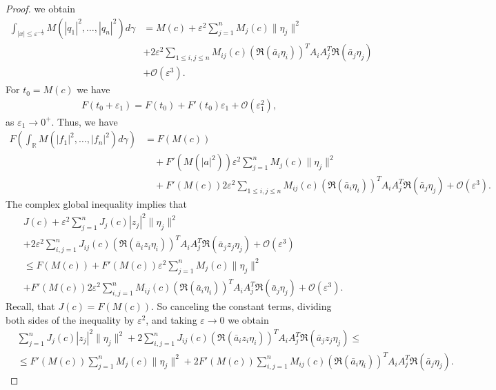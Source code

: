 \documentclass[10pt,a4paper]{amsart}
\begin{document}
\begin{proof}
		we obtain
		\begin{align*}
			\int_{| x|\leq \varepsilon^{-\frac{1}{2}}}M(|q_1|^2,\ldots,|q_n|^2)d\gamma &= M(c)  +\varepsilon^2\sum_{j=1}^n M_j(c) \|\eta_j\|^2\\
			&+ 2\varepsilon^2\sum_{1\leq i,j\leq n} M_{ij}(c)(\Re(\bar{a}_{i}\eta_{i}))^{T} A_iA_j^T\Re(\bar{a}_{j}\eta_{j})\\
   &+ \mathcal{O}(\varepsilon^3).
		\end{align*}
		For $t_{0}=M(c)$ we have 
		\begin{align*}
			F(t_{0}+\varepsilon_{1}) = F(t_{0}) +F'(t_{0})\varepsilon_{1}+\mathcal{O}(\varepsilon_{1}^{2}),
		\end{align*}
		as $\varepsilon_{1} \to 0^{+}$. Thus, we have
		\begin{align*}
			F\left( \int_{\mathbb{R}} M(|f_1|^2,\ldots,|f_n|^2) d\gamma\right) &  = F(M(c))\\
			&\quad+F'(M(|a|^2))\varepsilon^2\sum_{j=1}^n M_j(c) \|\eta_j\|^2\\
			&\quad +F'(M(c)) 2\varepsilon^2\sum_{1\leq i,j\leq n} M_{ij}(c)(\Re(\bar{a}_{i}\eta_{i}))^{T} A_iA_j^T \Re(\bar{a}_{j}\eta_{j})  + \mathcal{O}(\varepsilon^3).
		\end{align*}
		The complex global inequality implies that
		\begin{align*}
			& J(c)  +\varepsilon^2\sum_{j=1}^n J_j(c) |z_j|^2\|\eta_j\|^2\\
			&+ 2\varepsilon^2\sum_{ i,j=1}^{n} J_{ij}(c)(\Re(\bar{a}_{i}z_{i}\eta_{i}))^{T} A_{i}A_{j}^{T} \Re(\bar{a}_{j}z_{j}\eta_{j}) + \mathcal{O}(\varepsilon^3)\\
			&\leq F(M(c))+F'(M(c))\varepsilon^2\sum_{j=1}^n M_j(c) \|\eta_j\|^2\\
			& +F'(M(c)) 2\varepsilon^2 \sum_{ i,j=1}^{n} M_{ij}(c)(\Re(\bar{a}_{i}\eta_{i}))^{T} A_iA_j^T\Re(\bar{a}_{j}\eta_{j})  + \mathcal{O}(\varepsilon^3).
		\end{align*}
		Recall, that $J(c)=F(M(c))$. So canceling the constant terms,  dividing both sides of the inequality by $\varepsilon^{2}$,  and taking $\varepsilon \to 0$ we obtain 
		\begin{align*}
			& \sum_{j=1}^n J_j(c) |z_j|^2\|\eta_j\|^2+ 2 \sum_{ i,j=1}^{n} J_{ij}(c)(\Re(\bar{a}_{i}z_{i}\eta_{i}))^{T} A_{i}A_{j}^{T} \Re(\bar{a}_{j}z_{j}\eta_{j})\leq\\
			&\leq F'(M(c))\sum_{j=1}^n M_j(c) \|\eta_j\|^2+ 2F'(M(c)) \sum_{ i,j=1}^{n} M_{ij}(c)(\Re(\bar{a}_{i}\eta_{i}))^{T} A_iA_j^T \Re(\bar{a}_{j}\eta_{j}).
		\end{align*}

\end{proof}
\end{document}
